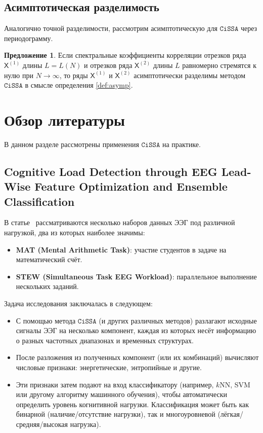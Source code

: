 \documentclass[12pt, specialist, subf
]{disser}
\theoremstyle{definition}
\newcommand{\CISSA}{\texttt{CiSSA}}
\newcommand{\TS}{\mathsf{X}}
\newtheorem{proposition}{Предложение}
\begin{document}
\subsection{Асимптотическая разделимость}

Аналогично точной разделимости, рассмотрим асимптотическую для $\CISSA$ через периодограмму.

\begin{proposition}
	\label{def:asymp_cissa}
	Если спектральные коэффициенты корреляции отрезков ряда \( \TS^{(1)} \) длины \( L = L(N) \) и отрезков ряда \( \TS^{(2)} \) длины \( L \) равномерно стремятся к нулю при \( N \to \infty \), то ряды \( \TS^{(1)} \) и \( \TS^{(2)} \) асимптотически разделимы методом $\CISSA$ в смысле определения \ref{def:asymp}.
\end{proposition}





\section{Обзор литературы}


В данном разделе рассмотрены применения $\CISSA$ на практике.

\subsection{Cognitive Load Detection through EEG Lead-Wise Feature Optimization and Ensemble Classification}

В статье~\cite{cognitive} рассматриваются несколько наборов данных ЭЭГ под различной нагрузкой, два из которых наиболее значимы:

\begin{itemize}
	\item \textbf{MAT (Mental Arithmetic Task)}: участие студентов в задаче на математический счёт.
	\item \textbf{STEW (Simultaneous Task EEG Workload)}: параллельное выполнение нескольких заданий.
\end{itemize}

Задача исследования заключалась в следующем:

\begin{itemize}
	\item С помощью метода $\CISSA$ (и других различных методов) разлагают исходные сигналы ЭЭГ на несколько компонент, каждая из которых несёт информацию о разных частотных диапазонах и временных структурах.
	\item После разложения из полученных компонент (или их комбинаций) вычисляют числовые признаки: энергетические, энтропийные и другие.
	\item Эти признаки затем подают на вход классификатору (например, $k$NN, SVM или другому алгоритму машинного обучения), чтобы автоматически определить уровень когнитивной нагрузки. Классификация может быть как бинарной (наличие/отсутствие нагрузки), так и многоуровневой (лёгкая/средняя/высокая нагрузка).
\end{itemize}
\end{document}
